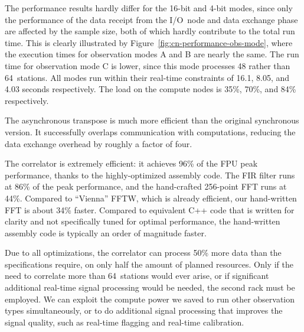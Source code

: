 \documentclass{sig-alternate}
\begin{document}

The performance results hardly differ for the 16-bit and 4-bit modes,
since only the performance of the data receipt from the I/O~node and data
exchange phase are affected by the sample size, 
both of which hardly contribute to the total run time.
This is clearly illustrated by Figure~\ref{fig:cn-performance-obs-mode},
where the execution times for observation modes \textsf{A} and \textsf{B}
are nearly the same.
The run time for observation mode \textsf{C} is lower, since this mode
processes 48 rather than 64~stations.
All modes run within their real-time constraints of 16.1, 8.05, and 4.03
seconds respectively.
The load on the compute nodes is 35\%, 70\%, and 84\% respectively.

The asynchronous transpose is much more efficient than the original synchronous
version. It successfully overlaps communication with computations, reducing
the data exchange overhead by roughly a factor of four.

The correlator is extremely efficient: it achieves 96\% of the FPU
peak performance, thanks to the highly-optimized assembly code.  The
FIR filter runs at 86\% of the peak performance, and the hand-crafted
256-point FFT runs at 44\%.  Compared to ``Vienna'' FFTW, which is already
efficient, our hand-written FFT is about 34\% faster.
Compared to equivalent C++ code that is written for clarity and
not specifically tuned for optimal performance, the hand-written
assembly code is typically an order of magnitude faster.


Due to all optimizations, the correlator can process 50\% more data than
the specifications require, on only half the amount of planned resources.
Only if the need to correlate more than 64~stations would ever arise, or if
significant additional real-time signal processing would be needed, the
second rack must be employed.
We can exploit the compute power we saved to run other observation types
simultaneously, or to do additional signal processing that improves the
signal quality, such as real-time flagging and real-time calibration.
\end{document}
